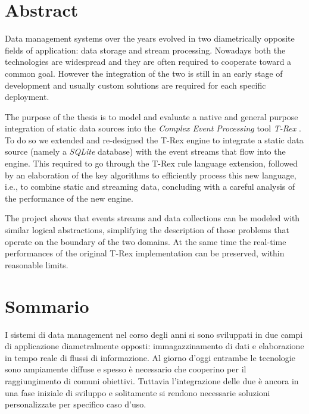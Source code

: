 \chapter*{Abstract}

Data management systems over the years evolved in two diametrically opposite fields of application: data storage and stream processing. Nowadays both the technologies are widespread and they are often required to cooperate toward a common goal. However the integration of the two is still in an early stage of development and usually custom solutions are required for each specific deployment.

The purpose of the thesis is to model and evaluate a native and general purpose integration of static data sources into the \emph{Complex Event Processing} tool \emph{T-Rex} \cite{trex}. To do so we extended and re-designed the T-Rex engine to integrate a static data source (namely a \emph{SQLite} database) with the event streams that flow into the engine. This required to go through the T-Rex rule language extension, followed by an elaboration of the key algorithms to efficiently process this new language, i.e., to combine static and streaming data, concluding with a careful analysis of the performance of the new engine.


The project shows that events streams and data collections can be modeled with similar logical abstractions, simplifying the description of those problems that operate on the boundary of the two domains. At the same time the real-time performances of the original T-Rex implementation can be preserved, within reasonable limits.

\chapter*{Sommario}
I sistemi di data management nel corso degli anni si sono sviluppati in due campi di applicazione diametralmente opposti: immagazzinamento di dati e elaborazione in tempo reale di flussi di informazione. Al giorno d'oggi entrambe le tecnologie sono ampiamente diffuse e spesso è necessario che cooperino per il raggiungimento di comuni obiettivi. Tuttavia l'in\-te\-gra\-zio\-ne delle due è ancora in una fase iniziale di sviluppo e solitamente si rendono necessarie soluzioni personalizzate per specifico caso d'uso.

